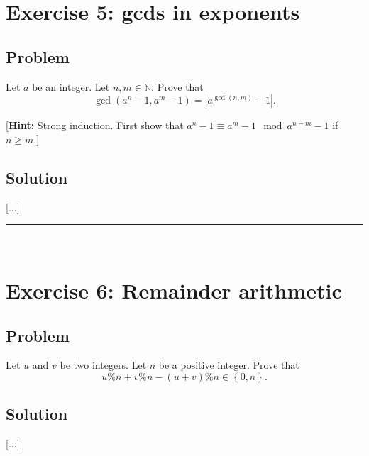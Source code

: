 \documentclass[paper=a4, fontsize=12pt]{scrartcl} %
\newcommand{\NN}{\mathbb{N}} %
\newcommand{\set}[1]{\left\{ #1 \right\}}
\newcommand{\abs}[1]{\left| #1 \right|}
\newcommand{\tup}[1]{\left( #1 \right)}
\newcommand{\horrule}[1]{\rule{\linewidth}{#1}} %
\theoremstyle{plainsl}
\theoremstyle{definition}
\theoremstyle{remark}
\begin{document}
\section{Exercise 5: gcds in exponents}

\subsection{Problem}

Let $a$ be an integer.
Let $n, m \in \NN$.
Prove that
\[
\gcd\tup{a^n - 1, a^m - 1}
= \abs{a^{\gcd\tup{n, m}} - 1}.
\]

[\textbf{Hint:} Strong induction. First show that
$a^n - 1 \equiv a^m - 1 \mod a^{n-m} - 1$ if $n \geq m$.]

\subsection{Solution}

[...]

\horrule{0.3pt} \\[0.4cm]

\section{Exercise 6: Remainder arithmetic}

\subsection{Problem}

Let $u$ and $v$ be two integers.
Let $n$ be a positive integer.
Prove that
\[
u \% n + v \% n - \tup{u+v} \% n \in \set{0, n} .
\]

\subsection{Solution}

[...]
\end{document}
